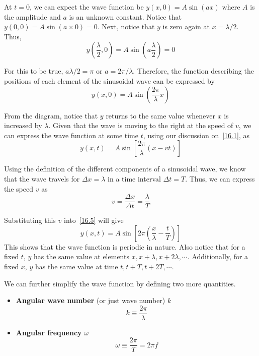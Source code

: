 At $t=0$, we can expect the wave function be $y(x, 0) = A\sin(ax)$ where $A$ is the amplitude 
and $a$ is an unknown constant. Notice that $y(0, 0) = A\sin(a\times0) = 0$. Next, notice that 
$y$ is zero again at $x = \lambda/2$. Thus, \[ y\left(\frac{\lambda}{2}, 0\right) =
A\sin\left(a\frac{\lambda}{2}\right) = 0 \]

For this to be true, $a\lambda/2 = \pi$ or $a = 2\pi/\lambda$. Therefore, the function
describing the positions of each element of the sinusoidal wave can be expressed by
\begin{equation}\label{16.4}
    y(x, 0) = A\sin\left(\frac{2\pi}{\lambda}x\right)
\end{equation}

From the diagram, notice that $y$ returns to the same value whenever $x$ is increased by $\lambda$.
Given that the wave is moving to the right at the speed of $v$, we can express the wave function 
at some time $t$, using our discussion on~\eqref{16.1}, as 
\begin{equation}\label{16.5}
    y(x, t) = A\sin\left[\frac{2\pi}{\lambda}(x - vt)\right]
\end{equation}

Using the definition of the different components of a sinusoidal wave, we know that the wave 
travels for $\Delta x = \lambda$ in a time interval $\Delta t = T$. Thus, we can express the speed 
$v$ as 
\begin{equation}\label{16.6}
    v = \frac{\Delta x}{\Delta t} = \frac{\lambda}{T}
\end{equation}

Substituting this $v$ into~\eqref{16.5} will give
\begin{equation}\label{16.7}
    y(x, t) = A\sin\left[2\pi\left(\frac{x}{\lambda} - \frac{t}{T}\right)\right]
\end{equation}
This shows that the wave function is periodic in nature. Also notice that for a fixed $t$, $y$
has the same value at elements $x, x+\lambda, x + 2\lambda, \cdots$. Additionally, for a fixed $x$,
$y$ has the same value at time $t, t+T, t + 2T, \cdots$.

We can further simplify the wave function by defining two more quantities.
\begin{itemize}
    \item \textbf{Angular wave number} (or just wave number) $k$
        \begin{equation}\label{16.8}
            k \equiv \frac{2\pi}{\lambda}
        \end{equation}
    \item \textbf{Angular frequency} $\omega$
        \begin{equation}\label{16.9}
            \omega\equiv \frac{2\pi}{T} = 2\pi f
        \end{equation}
\end{itemize}

